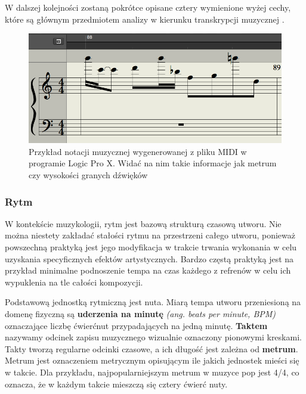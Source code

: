 \documentclass[12pt,a4paper,twoside]{mwart}
\begin{document}
W dalszej kolejności zostaną pokrótce opisane cztery wymienione wyżej cechy, które są głównym przedmiotem analizy w kierunku transkrypcji muzycznej \cite[63]{Homerecording:DlaKazdego}.
\begin{figure}[H]
  \begin{center}
    \includegraphics[scale=0.5]{images/pieciolinia_logic.png}
    \caption{Przykład notacji muzycznej wygenerowanej z pliku MIDI w programie Logic Pro X. Widać na nim takie informacje jak metrum czy wysokości granych dźwięków}
  \end{center}
\end{figure}
\subsubsection{Rytm}

W kontekście muzykologii, rytm jest bazową strukturą czasową utworu. Nie można niestety zakładać stałości rytmu na przestrzeni całego utworu, ponieważ powszechną praktyką jest jego modyfikacja w trakcie trwania wykonania w celu uzyskania specyficznych efektów artystycznych. Bardzo częstą praktyką jest na przykład minimalne podnoszenie tempa na czas każdego z refrenów w celu ich wypuklenia na tle całości kompozycji.

Podstawową jednostką rytmiczną jest nuta. Miarą tempa utworu przeniesioną na domenę fizyczną są \textbf{uderzenia na minutę} \textit{(ang. beats per minute, BPM)} oznaczające liczbę ćwierćnut przypadających na jedną minutę. \textbf{Taktem} nazywamy odcinek zapisu muzycznego wizualnie oznaczony pionowymi kreskami. Takty tworzą regularne odcinki czasowe, a ich długość jest zależna od \textbf{metrum}. Metrum jest oznaczeniem metrycznym opisującym ile jakich jednostek mieści się w takcie. Dla przykładu, najpopularniejszym metrum w muzyce pop jest 4/4, co oznacza, że w każdym takcie mieszczą się cztery ćwierć nuty.
\end{document}
